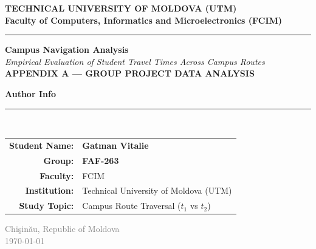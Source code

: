 \documentclass[11pt, a4paper]{article}
\begin{document}
\begin{titlepage}
    \centering
    \vspace*{1cm}

    {\Large \textbf{\textcolor{primary}{TECHNICAL UNIVERSITY OF MOLDOVA (UTM)}}} \\[0.4em]
    {\large \textbf{\textcolor{secondary}{Faculty of Computers, Informatics and Microelectronics (FCIM)}}} \\[0.2em]
    \rule{0.85\textwidth}{1.5pt}

    \vspace{3.5cm}

    {\Huge \bfseries \textcolor{primary}{Campus Navigation Analysis}} \\[1em]
    {\Large \textcolor{secondary}{\textit{Empirical Evaluation of Student Travel Times Across Campus Routes}}} \\[0.5em]
    {\small \textcolor{accent}{\textbf{APPENDIX A --- GROUP PROJECT DATA ANALYSIS}}}

    \vspace{4.5cm}

    \begin{tcolorbox}[colframe=primary, colback=lightbg, width=0.85\textwidth, arc=6pt]
        \centering
        \vspace{0.3em}
        {\large \textbf{Author Info}} \\[0.5em]
        \rule{0.6\textwidth}{0.5pt} \\[0.6em]
        \begin{tabular}{r l}
            \textbf{Student Name:} & \textbf{Gatman Vitalie} \\
            \textbf{Group:} & \textbf{FAF-263} \\
            \textbf{Faculty:} & FCIM \\
            \textbf{Institution:} & Technical University of Moldova (UTM) \\
            \textbf{Study Topic:} & Campus Route Traversal ($t_1$ vs $t_2$) \\
        \end{tabular}
        \vspace{0.3em}
    \end{tcolorbox}

    \vfill

    {\small \textcolor{gray}{Chişinău, Republic of Moldova}} \\
    {\small \textcolor{gray}{\today}}

\end{titlepage}
\end{document}
